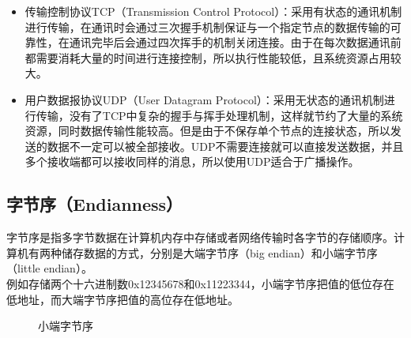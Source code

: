 \begin{itemize}
    \item 传输控制协议TCP（Transmission Control Protocol）：采用有状态的通讯机制进行传输，在通讯时会通过三次握手机制保证与一个指定节点的数据传输的可靠性，在通讯完毕后会通过四次挥手的机制关闭连接。由于在每次数据通讯前都需要消耗大量的时间进行连接控制，所以执行性能较低，且系统资源占用较大。

    \item 用户数据报协议UDP（User Datagram Protocol）：采用无状态的通讯机制进行传输，没有了TCP中复杂的握手与挥手处理机制，这样就节约了大量的系统资源，同时数据传输性能较高。但是由于不保存单个节点的连接状态，所以发送的数据不一定可以被全部接收。UDP不需要连接就可以直接发送数据，并且多个接收端都可以接收同样的消息，所以使用UDP适合于广播操作。
\end{itemize}

\vspace{0.5cm}

\subsection{字节序（Endianness）}

字节序是指多字节数据在计算机内存中存储或者网络传输时各字节的存储顺序。计算机有两种储存数据的方式，分别是大端字节序（big endian）和小端字节序（little endian）。\\

例如存储两个十六进制数0x12345678和0x11223344，小端字节序把值的低位存在低地址，而大端字节序把值的高位存在低地址。\\

\begin{figure}[H]
    \centering
    \caption{小端字节序}
\end{figure}

